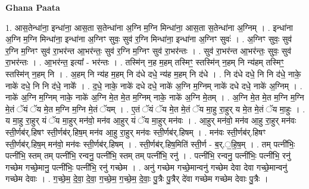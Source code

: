 \documentclass[17pt]{extarticle}
\begin{document}
\textbf{Ghana Paata } \newline

1. आस॒तेन्धा॑ना॒ इन्धा॑ना॒ आस॒ता स॒तेन्धा॑ना अ॒ग्नि म॒ग्नि मिन्धा॑ना॒ आस॒ता स॒तेन्धा॑ना अ॒ग्निम् । . इन्धा॑ना अ॒ग्नि म॒ग्नि मिन्धा॑ना॒ इन्धा॑ना अ॒ग्निꣳ सुवः॒ सुव॑ र॒ग्नि मिन्धा॑ना॒ इन्धा॑ना अ॒ग्निꣳ सुवः॑ । . अ॒ग्निꣳ सुवः॒ सुव॑ र॒ग्नि म॒ग्निꣳ सुव॑ रा॒भर॑न्त आ॒भर॑न्तः॒ सुव॑ र॒ग्नि म॒ग्निꣳ सुव॑ रा॒भर॑न्तः । . सुव॑ रा॒भर॑न्त आ॒भर॑न्तः॒ सुवः॒ सुव॑ रा॒भर॑न्तः । . आ॒भर॑न्त॒ इत्या᳚ - भर॑न्तः । . तस्मि॑न् न॒ह म॒हम् तस्मिꣳ॒॒ स्तस्मि॑न् न॒हम् नि न्य॑हम् तस्मिꣳ॒॒ स्तस्मि॑न् न॒हम् नि । . अ॒हम् नि न्य॑ह म॒हम् नि द॑धे दधे॒ न्य॑ह म॒हम् नि द॑धे । . नि द॑धे दधे॒ नि नि द॑धे॒ नाके॒ नाके॑ दधे॒ नि नि द॑धे॒ नाके᳚ । . द॒धे॒ नाके॒ नाके॑ दधे दधे॒ नाके॑ अ॒ग्नि म॒ग्निम् नाके॑ दधे दधे॒ नाके॑ अ॒ग्निम् । . नाके॑ अ॒ग्नि म॒ग्निम् नाके॒ नाके॑ अ॒ग्नि मे॒त मे॒त म॒ग्निम् नाके॒ नाके॑ अ॒ग्नि मे॒तम् । . अ॒ग्नि मे॒त मे॒त म॒ग्नि म॒ग्नि मे॒तं ॅयं ॅय मे॒त म॒ग्नि म॒ग्नि मे॒तं ॅयम् । . ए॒तं ॅयं ॅय मे॒त मे॒तं ॅय मा॒हु रा॒हुर् य मे॒त मे॒तं ॅय मा॒हुः । . य मा॒हु रा॒हुर् यं ॅय मा॒हुर् मन॑वो॒ मन॑व आ॒हुर् यं ॅय मा॒हुर् मन॑वः । . आ॒हुर् मन॑वो॒ मन॑व आ॒हु रा॒हुर् मन॑वः स्ती॒र्णब॑र्.हिषꣳ स्ती॒र्णब॑र्.हिष॒म् मन॑व आ॒हु रा॒हुर् मन॑वः स्ती॒र्णब॑र्.हिषम् । . मन॑वः स्ती॒र्णब॑र्.हिषꣳ स्ती॒र्णब॑र्.हिष॒म् मन॑वो॒ मन॑वः स्ती॒र्णब॑र्.हिषम् । . स्ती॒र्णब॑र्.हिष॒मिति॑ स्ती॒र्ण - ब॒र्.॒हि॒ष॒म् । . तम् पत्नी॑भिः॒ पत्नी॑भि॒ स्तम् तम् पत्नी॑भि॒ रन्वनु॒ पत्नी॑भि॒ स्तम् तम् पत्नी॑भि॒ रनु॑ । . पत्नी॑भि॒ रन्वनु॒ पत्नी॑भिः॒ पत्नी॑भि॒ रनु॑ गच्छेम गच्छे॒मानु॒ पत्नी॑भिः॒ पत्नी॑भि॒ रनु॑ गच्छेम । . अनु॑ गच्छेम गच्छे॒मान्वनु॑ गच्छेम देवा देवा गच्छे॒मान्वनु॑ गच्छेम देवाः । . ग॒च्छे॒म॒ दे॒वा॒ दे॒वा॒ ग॒च्छे॒म॒ ग॒च्छे॒म॒ दे॒वाः॒ पु॒त्रैः पु॒त्रैर् दे॑वा गच्छेम गच्छेम देवाः पु॒त्रैः । \newline
\end{document}
